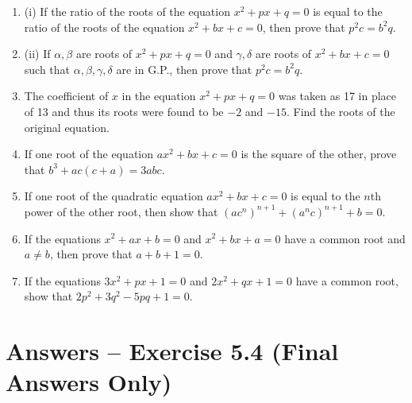 \documentclass[12pt,a4paper]{article}
\begin{document}
\begin{enumerate}
		\item (i) If the ratio of the roots of the equation $x^2 + px + q = 0$ is equal to the ratio of the roots of the equation $x^2 + bx + c = 0$, then prove that $p^2c = b^2q$.
		\item (ii) If $\alpha, \beta$ are roots of $x^2 + px + q = 0$ and $\gamma, \delta$ are roots of $x^2 + bx + c = 0$ such that $\alpha, \beta, \gamma, \delta$ are in G.P., then prove that $p^2c = b^2q$.
		
		\item The coefficient of $x$ in the equation $x^2 + px + q = 0$ was taken as 17 in place of 13 and thus its roots were found to be $-2$ and $-15$. Find the roots of the original equation.
		
		\item If one root of the equation $ax^2 + bx + c = 0$ is the square of the other, prove that $b^3 + ac(c + a) = 3abc$.
		
		\item If one root of the quadratic equation $ax^2 + bx + c = 0$ is equal to the $n$th power of the other root, then show that $(ac^n)^{n+1} + (a^n c)^{n+1} + b = 0$.
		
		\item If the equations $x^2 + ax + b = 0$ and $x^2 + bx + a = 0$ have a common root and $a \neq b$, then prove that $a + b + 1 = 0$.
		
		\item If the equations $3x^2 + px + 1 = 0$ and $2x^2 + qx + 1 = 0$ have a common root, show that $2p^2 + 3q^2 - 5pq + 1 = 0$.
	\end{enumerate}
	
	\section*{Answers -- Exercise 5.4 (Final Answers Only)}
	
\end{document}
